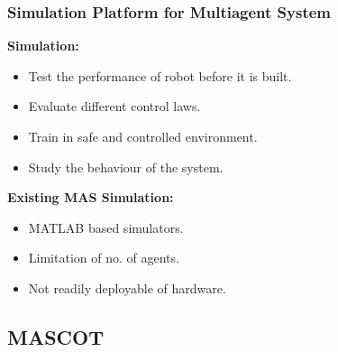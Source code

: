 \documentclass[10pt]{beamer}
\begin{document}
\begin{frame}
	\frametitle{Simulation Platform for Multiagent System}
	\begin{block}{\textbf{Simulation:}}
		\begin{itemize}
			\item Test the performance of robot before it is built.
			\item Evaluate different control laws.
			\item Train in safe and controlled environment.
			\item Study the behaviour of the system.
		\end{itemize}
		\pause
		\vspace*{0.1 cm}
	\end{block}
	\begin{block}{\textbf{Existing MAS Simulation:}}
		\begin{itemize}
			\item MATLAB based simulators.
			\item Limitation of no. of agents.
			\item Not readily deployable of hardware.
		\end{itemize}
	\end{block}

\end{frame}


\subsection*{MASCOT}
\end{document}
